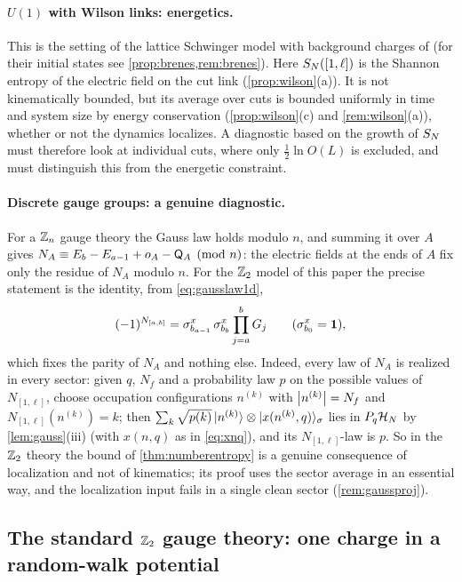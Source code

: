\paragraph{$U(1)$ with Wilson links: energetics.}
This is the setting of the lattice Schwinger model with background charges of \cite{Brenes2018} (for their initial
states see \cref{prop:brenes,rem:brenes}).  Here
$S_{N}([1,\ell])$ is the Shannon entropy of the electric field on the cut link (\cref{prop:wilson}(a)).  It is not
kinematically bounded, but its average over cuts is bounded uniformly in time and system size by energy
conservation (\cref{prop:wilson}(c) and \cref{rem:wilson}(a)), whether or not the dynamics localizes.  A
diagnostic based on the growth of $S_{N}$ must therefore look at individual cuts, where only $\frac12\ln O(L)$ is
excluded, and must distinguish this from the energetic constraint.

\paragraph{Discrete gauge groups: a genuine diagnostic.}
For a $\mathbb{Z}_n$ gauge theory the Gauss law holds modulo $n$, and summing it over $A$ gives
$N_A\equiv E_b-E_{a-1}+o_A-\mathsf{Q}_A\pmod n$: the electric fields at the ends of $A$ fix only the residue of $N_A$
modulo $n$.  For the $\mathbb{Z}_2$ model of this paper the precise statement is the identity, from
\eqref{eq:gausslaw1d},
\begin{equation}\label{eq:Z2parity}
  (-1)^{N_{[a,b]}}=\sigma^x_{b_{a-1}}\,\sigma^x_{b_b}\prod_{j=a}^bG_j\qquad(\sigma^x_{b_0}=\mathbf{1}),
\end{equation}
which fixes the parity of $N_A$ and nothing else.  Indeed, every law of $N_A$ is realized in every sector: given
$q$, $N_f$ and a probability law $p$ on the possible values of $N_{[1,\ell]}$, choose occupation configurations
$n^{(k)}$ with $\left|n^{(k)}\right|=N_f$ and $N_{[1,\ell]}(n^{(k)})=k$; then
$\sum_k\sqrt{p(k)}\,|n^{(k)}\rangle\otimes|x(n^{(k)},q)\rangle_\sigma$ lies in $P_q\mathcal{H}_N$ by \cref{lem:gauss}(iii) (with $x(n,q)$
as in \eqref{eq:xnq}), and its $N_{[1,\ell]}$-law is $p$.  So in the $\mathbb{Z}_2$ theory the bound of
\cref{thm:numberentropy} is a genuine consequence of localization and not of kinematics; its proof uses the
sector average in an essential way, and the localization input fails in a single clean sector
(\cref{rem:gaussproj}).

\subsection{The standard \texorpdfstring{$\mathbb{Z}_2$}{Z2} gauge theory: one charge in a random-walk potential}\label{sec:u1:rw}

